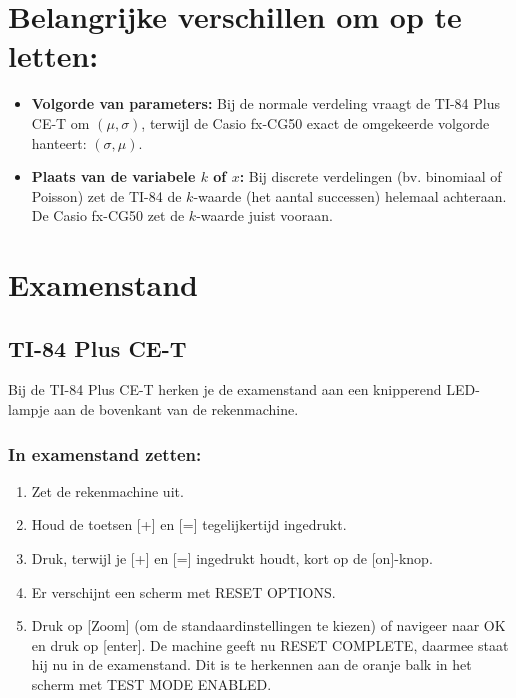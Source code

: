 \documentclass{article}
\begin{document}
    \section{Belangrijke verschillen om op te letten:}
    \begin{itemize}
        \item \textbf{Volgorde van parameters:} Bij de normale verdeling vraagt de TI-84 Plus CE-T om $(\mu, \sigma)$, terwijl de Casio fx-CG50 exact de omgekeerde volgorde hanteert: $(\sigma, \mu)$.
        \item \textbf{Plaats van de variabele $k$ of $x$:} Bij discrete verdelingen (bv. binomiaal of Poisson) zet de TI-84 de $k$-waarde (het aantal successen) helemaal achteraan. De Casio fx-CG50 zet de $k$-waarde juist vooraan.
    \end{itemize}

    \section{Examenstand}
    \subsection*{TI-84 Plus CE-T}
    Bij de TI-84 Plus CE-T herken je de examenstand aan een knipperend LED-lampje aan de bovenkant van de rekenmachine.

    \subsubsection*{In examenstand zetten:}
    \begin{enumerate}
        \item Zet de rekenmachine uit.
        \item Houd de toetsen [+] en [=] tegelijkertijd ingedrukt.
        \item Druk, terwijl je [+] en [=] ingedrukt houdt, kort op de [on]-knop.
        \item Er verschijnt een scherm met RESET OPTIONS.
        \item Druk op [Zoom] (om de standaardinstellingen te kiezen) of navigeer naar OK en druk op [enter]. 
        De machine geeft nu RESET COMPLETE, daarmee staat hij nu in de examenstand. Dit is te herkennen aan de oranje balk in het scherm met TEST MODE ENABLED.
    \end{enumerate}
\end{document}
